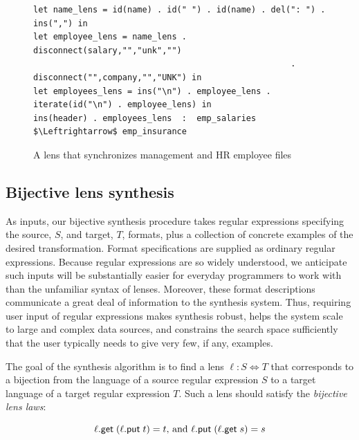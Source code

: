 \documentclass[12pt]{article}
\begin{document}
{\begin{figure}
\begin{lstlisting}
let name_lens = id(name) . id(" ") . id(name) . del(": ") . ins(",") in
let employee_lens = name_lens . disconnect(salary,"","unk","") 
                                                    . disconnect("",company,"","UNK") in
let employees_lens = ins("\n") . employee_lens . iterate(id("\n") . employee_lens) in
ins(header) . employees_lens  :  emp_salaries $\Leftrightarrow$ emp_insurance
\end{lstlisting}
  \caption{A lens that synchronizes management and HR employee files}
  \label{fig:example_lens}
\end{figure}

\subsection{Bijective lens synthesis}

As inputs, our bijective synthesis procedure takes regular expressions specifying the
source, $S$, and
target, $T$, formats, plus a collection of concrete examples of the desired 
transformation.  Format specifications are supplied as ordinary regular
expressions.
Because regular expressions are so widely understood, we anticipate such
inputs will be substantially easier for everyday programmers to work with
than the unfamiliar syntax of lenses.
Moreover, these format descriptions communicate a
great deal of information to the synthesis system.  Thus, requiring user input
of regular expressions makes synthesis robust, 
helps the system scale to large and complex data sources, and 
constrains the search space sufficiently that the user typically needs
to give very few, if any, examples.

The goal of the synthesis algorithm is to find a lens
$\ell : S \Leftrightarrow T$ that corresponds to a bijection from the language
of a source regular expression $S$ to a target language of a target regular
expression $T$.   Such a lens should satisfy the \textit{bijective lens laws}:

\begin{equation}\label{bijectivelenslaws} \ell.\mathsf{get} \;
  (\ell.\mathsf{put} \; t) = t \text{, and } \ell.\mathsf{put} \; (\ell.\mathsf{get} \; s) = s
\end{equation}

\begin{figure}
  \centering
  \small 
\end{figure}}
\end{document}

